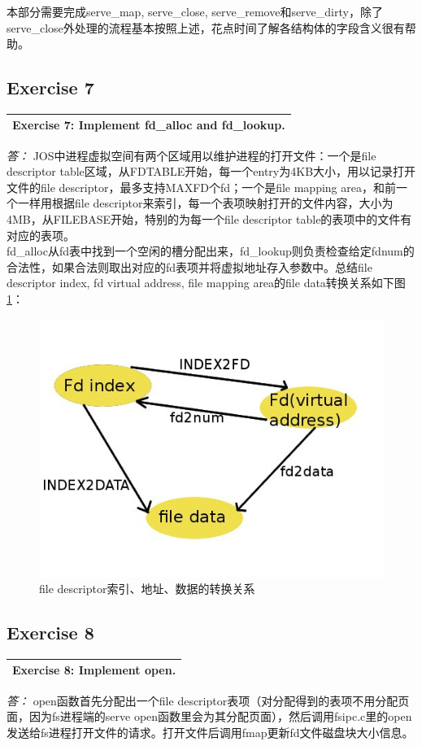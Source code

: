 \documentclass[11pt,a4paper]{article}
\newcommand{\exercise}[2]{
\begin{tabular}{|p{\textwidth}|}
\hline
#1: #2\\
\hline
\end{tabular}
\textit{\large{答：}}}
\begin{document}
本部分需要完成serve\_map, serve\_close, serve\_remove和serve\_dirty，除了serve\_close外处理的流程基本按照上述，花点时间了解各结构体的字段含义很有帮助。

\subsection{Exercise 7}
\exercise{Exercise 7}{Implement fd\_alloc and fd\_lookup.}
JOS中进程虚拟空间有两个区域用以维护进程的打开文件：一个是file descriptor table区域，从FDTABLE开始，每一个entry为4KB大小，用以记录打开文件的file descriptor，最多支持MAXFD个fd；一个是file mapping area，和前一个一样用根据file descriptor来索引，每一个表项映射打开的文件内容，大小为4MB，从FILEBASE开始，特别的为每一个file descriptor table的表项中的文件有对应的表项。\\
fd\_alloc从fd表中找到一个空闲的槽分配出来，fd\_lookup则负责检查给定fdnum的合法性，如果合法则取出对应的fd表项并将虚拟地址存入参数中。总结file descriptor index, fd virtual address, file mapping area的file data转换关系如下图\ref{transfer}：\\
\begin{figure}[!ht]
\begin{center}
\includegraphics[width = \textwidth]{fd_index_data.jpg}
\end{center}
\caption{file descriptor索引、地址、数据的转换关系}\label{transfer}
\end{figure}

\subsection{Exercise 8}
\exercise{Exercise 8}{Implement open.}
open函数首先分配出一个file descriptor表项（对分配得到的表项不用分配页面，因为fs进程端的serve open函数里会为其分配页面），然后调用fsipc.c里的open发送给fs进程打开文件的请求。打开文件后调用fmap更新fd文件磁盘块大小信息。
\end{document}
